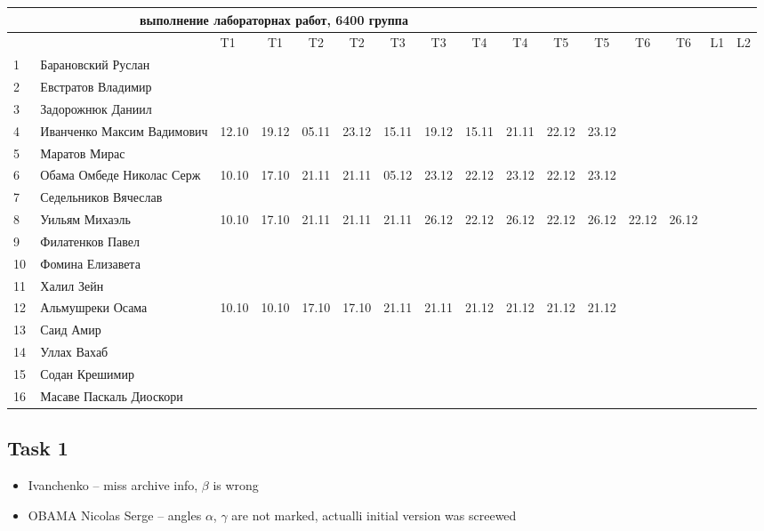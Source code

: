 \documentclass[a4paper,landscape,11pt]{article}
\begin{document}
\newpage
%
\hspace{-3.1cm} %
\begin{tabular}{l|llccc|cccc|cccccc}
\multicolumn{10}{c}{выполнение лабораторнах работ, 6400 группа} \\
\toprule
&&T1&T1& T2&T2& T3&T3& T4&T4&T5&T5&T6&T6&L1&L2\\
\midrule
1\,&  Барановский Руслан         &&&&&&&&\\
2\,&  Евстратов Владимир         &&&&&&&&\\
3\,&  Задорожнюк Даниил          &&&&&&&&\\
4\,&  Иванченко Максим Вадимович &12.10& 19.12& 05.11& 23.12& 15.11& 19.12& 15.11& 21.11& 22.12& 23.12\\
5\,&  Маратов Мирас              &&&&&&&&\\
\midrule
6\,&  Обама Омбеде Николас Серж  &10.10& 17.10& 21.11& 21.11& 05.12& 23.12& 22.12&23.12&22.12&23.12\\   %
7\,&  Седельников Вячеслав       &&&&&&&&\\
8\,&  Уильям Михаэль             &10.10& 17.10& 21.11& 21.11& 21.11& 26.12&22.12&26.12& 22.12&26.12& 22.12& 26.12\\   %
9\,&  Филатенков Павел           &&&&&&&&\\
10\,& Фомина Елизавета           &&&&&&&&\\
\midrule
11\,& Халил Зейн                 &&&&&&&&\\
12\,& Альмушреки Осама           &10.10&10.10& 17.10&17.10& 21.11&21.11& 21.12&21.12 & 21.12 & 21.12\\   %
13\,& Саид Амир                  &&&&&&&&\\
14\,& Уллах Вахаб                &&&&&&&&\\
15\,& Содан Крешимир             &&&&&&&&\\
16\,& Масаве Паскаль Диоскори    &&&&&&&&\\
\bottomrule
\end{tabular}

\subsection{Task 1}
\begin{itemize}
\item Ivanchenko -- miss archive info, $\beta$ is wrong
\item OBAMA Nicolas Serge -- angles $\alpha$, $\gamma$ are not marked, actualli initial version was screewed
\end{itemize}
\end{document}
